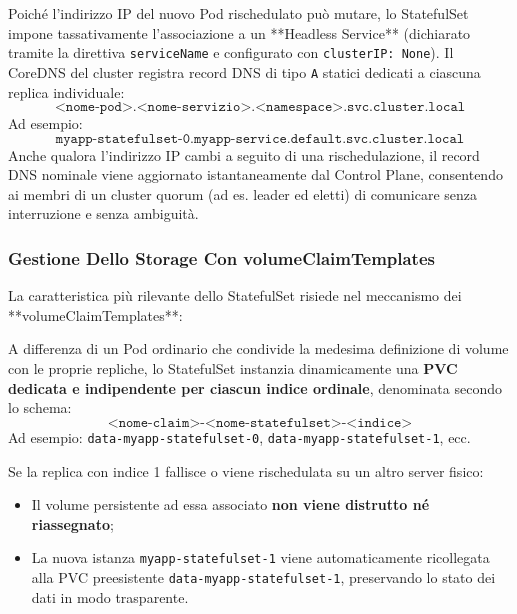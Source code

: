 \documentclass[11pt, a4paper]{article}
\begin{document}
Poiché l'indirizzo IP del nuovo Pod rischedulato può mutare, lo StatefulSet impone tassativamente l'associazione a un **Headless Service** (dichiarato tramite la direttiva \texttt{serviceName} e configurato con \texttt{clusterIP: None}). Il CoreDNS del cluster registra record DNS di tipo \texttt{A} statici dedicati a ciascuna replica individuale:
\[
\texttt{<nome-pod>.<nome-servizio>.<namespace>.svc.cluster.local}
\]
Ad esempio:
\[
\texttt{myapp-statefulset-0.myapp-service.default.svc.cluster.local}
\]
Anche qualora l'indirizzo IP cambi a seguito di una rischedulazione, il record DNS nominale viene aggiornato istantaneamente dal Control Plane, consentendo ai membri di un cluster quorum (ad es. leader ed eletti) di comunicare senza interruzione e senza ambiguità.

\subsubsection{Gestione Dello Storage Con volumeClaimTemplates}
La caratteristica più rilevante dello StatefulSet risiede nel meccanismo dei **volumeClaimTemplates**:


A differenza di un Pod ordinario che condivide la medesima definizione di volume con le proprie repliche, lo StatefulSet instanzia dinamicamente una \textbf{PVC dedicata e indipendente per ciascun indice ordinale}, denominata secondo lo schema:
\[
\texttt{<nome-claim>-<nome-statefulset>-<indice>}
\]
Ad esempio: \texttt{data-myapp-statefulset-0}, \texttt{data-myapp-statefulset-1}, ecc.

Se la replica con indice 1 fallisce o viene rischedulata su un altro server fisico:
\begin{itemize}[noitemsep]
    \item Il volume persistente ad essa associato \textbf{non viene distrutto né riassegnato};
    \item La nuova istanza \texttt{myapp-statefulset-1} viene automaticamente ricollegata alla PVC preesistente \texttt{data-myapp-statefulset-1}, preservando lo stato dei dati in modo trasparente.
\end{itemize}
\end{document}
